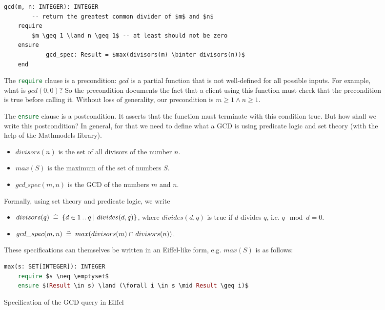 \documentclass[runningheads,12pt]{article}
\newcommand{\e}[1]{\lstinline[language=eiffel]|#1|}
\begin{document}
\begin{figure}[!htb]
\begin{framed}
\lstset{language=eiffel}    
\begin{lstlisting} 
gcd(m, n: INTEGER): INTEGER
		-- return the greatest common divider of $m$ and $n$
	require
		$m \geq 1 \land n \geq 1$ -- at least should not be zero
	ensure 
			gcd_spec: Result = $max(divisors(m) \binter divisors(n))$
	end
\end{lstlisting}
\end{framed}

The \e{require} clause is a precondition: $gcd$ is a partial function that is not well-defined for all possible inputs. For example, what is $gcd(0,0)$? So the precondition documents the fact that a client using this function must check that the precondition is true before calling it. Without loss of generality, our precondition is $m \geq 1 \land n \geq 1$.

\smallskip
The \e{ensure} clause is a postcondition. It asserts that the function must terminate with this condition true. But how shall we write this postcondition? In general, for that we need to define what a GCD is using predicate logic and set theory (with the help of the Mathmodels library).  

\begin{itemize}
  \item $divisors(n)$ is the set of all divisors of the number $n$. 
  \item $max(S)$ is the maximum of the set of numbers $S$. 
  \item $gcd\_spec(m,n)$ is the GCD of the numbers $m$ and $n$.
\end{itemize}

Formally, using set theory and predicate logic, we write

\begin{itemize}
  \item $divisors(q) \;\mathrel{\widehat=}\; \{d \in 1 \mathbin{.\mkern1mu.} q \mid divides(d, q)\}$, where $divides(d, q)$ is true if $d$ divides $q$, i.e. $q \mod d = 0$. 
  \item $gcd\_spec(m,n) \;\mathrel{\widehat=}\; max(divisors(m) \mathbin{\mkern1mu\cap\mkern1mu} divisors(n))$.
\end{itemize}

These specifications can themselves be written in an Eiffel-like form, e.g. $max(S)$ is as follows:

\begin{framed}
\begin{lstlisting}[language=eiffel]
max(s: SET[INTEGER]): INTEGER
	require $s \neq \emptyset$
	ensure $(Result \in s) \land (\forall i \in s \mid Result \geq i)$
\end{lstlisting}
\end{framed}
\caption{Specification of the GCD query in Eiffel}
\label{fig:gcd-spec}
\end{figure}
\end{document}
